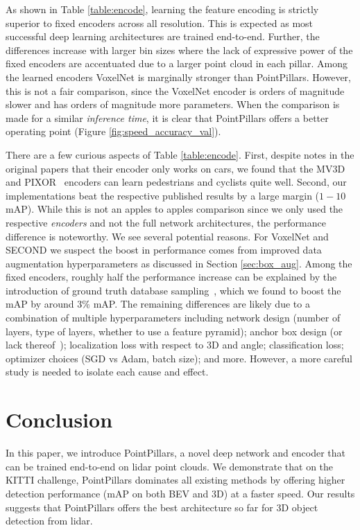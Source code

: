 \documentclass[10pt,twocolumn,letterpaper]{article}
\newcommand{\figref}[1]{Figure \ref{#1}}
\newcommand{\tableref}[1]{Table \ref{#1}}
\newcommand{\secref}[1]{Section \ref{#1}}
\newcommand{\squeeze}{\vspace{-0.5mm}}
\begin{document}
As shown in \tableref{table:encode}, learning the feature encoding is strictly superior to fixed encoders across all resolution.
This is expected as most successful deep learning architectures are trained end-to-end.
Further, the differences increase with larger bin sizes where the lack of expressive power of the fixed encoders are accentuated due to a larger point cloud in each pillar.
Among the learned encoders VoxelNet is marginally stronger than PointPillars.
However, this is not a fair comparison, since the VoxelNet encoder is orders of magnitude slower and has orders of magnitude more parameters.
When the comparison is made for a similar \emph{inference time}, it is clear that PointPillars offers a better operating point (\figref{fig:speed_accuracy_val}).

There are a few curious aspects of \tableref{table:encode}.
First, despite notes in the original papers that their encoder only works on cars, we found that the MV3D~\cite{mv3d} and PIXOR~\cite{pixor} encoders can learn pedestrians and cyclists quite well.
Second, our implementations beat the respective published results by a large margin ($1-10$ mAP).
While this is not an apples to apples comparison since we only used the respective \emph{encoders} and not the full network architectures, the performance difference is noteworthy.
We see several potential reasons.
For VoxelNet and SECOND we suspect the boost in performance comes from improved data augmentation hyperparameters as discussed in \secref{sec:box_aug}.
Among the fixed encoders, roughly half the performance increase can be explained by the introduction of ground truth database sampling~\cite{second}, which we found to boost the mAP by around $3\%$ mAP.
The remaining differences are likely due to a combination of multiple hyperparameters including network design (number of layers, type of layers, whether to use a feature pyramid); anchor box design (or lack thereof~\cite{pixor}); localization loss with respect to 3D and angle; classification loss; optimizer choices (SGD vs Adam, batch size); and more.
However, a more careful study is needed to isolate each cause and effect.

 
\squeeze
\section{Conclusion} \label{sec:conclusion}
\squeeze

In this paper, we introduce PointPillars, a novel deep network and encoder that can be trained end-to-end on lidar point clouds.
We demonstrate that on the KITTI challenge, PointPillars dominates all existing methods by offering higher detection performance (mAP on both BEV and 3D) at a faster speed.
Our results suggests that PointPillars offers the best architecture so far for 3D object detection from lidar.
 
{\small


}
\end{document}
